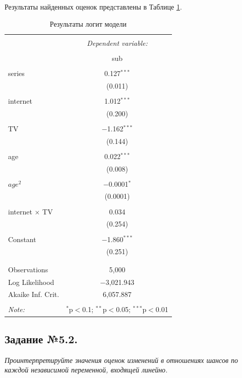 \documentclass[a4paper,12pt]{article}
\begin{document}
	Результаты найденных оценок представлены в Таблице \ref{logit}.
	\begin{table}[!h] \centering 
		  \caption{Результаты логит модели} 
		  \label{logit} 
		\begin{tabular}{@{\extracolsep{5pt}}lc} 
		\\[-2ex]\hline 
		\hline \\[-2ex] 
		 & \multicolumn{1}{c}{\textit{Dependent variable:}} \\ 
		\cline{2-2} 
		\\[-2ex] & sub \\ 
		\hline \\[-2ex] 
		 series & 0.127$^{***}$ \\ 
		  & (0.011) \\ 
		  & \\ 
		 internet & 1.012$^{***}$ \\ 
		  & (0.200) \\ 
		  & \\ 
		 TV & $-$1.162$^{***}$ \\ 
		  & (0.144) \\ 
		  & \\ 
		 age & 0.022$^{***}$ \\ 
		  & (0.008) \\ 
		  & \\ 
		 $age^2$ & $-$0.0001$^{*}$ \\ 
		  & (0.0001) \\ 
		  & \\ 
		 internet $\times$ TV & 0.034 \\ 
		  & (0.254) \\ 
		  & \\ 
		 Constant & $-$1.860$^{***}$ \\ 
		  & (0.251) \\ 
		  & \\ 
		\hline \\[-3ex] 
		Observations & 5,000 \\ 
		Log Likelihood & $-$3,021.943 \\ 
		Akaike Inf. Crit. & 6,057.887 \\ 
		\hline 
		\hline \\[-2ex] 
		\textit{Note:}  & \multicolumn{1}{r}{$^{*}$p$<$0.1; $^{**}$p$<$0.05; $^{***}$p$<$0.01} \\ 
		\end{tabular} 
		\end{table}
	
		\subsection{Задание №5.2.}
		\textit{
	Проинтерпретируйте значения оценок изменений в отношениях шансов по каждой независимой переменной, входящей линейно.}
	
\end{document}
